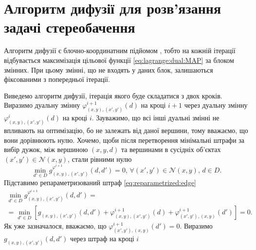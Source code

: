 \section{Алгоритм дифузії для розв'язання задачі стереобачення}

Алгоритм дифузії є блочно-координатним підйомом
\cite{overview:savchynskyy:diffusion},
тобто на кожній ітерації відбувається максимізація цільової функції
\eqref{eq:lagrange:dual:MAP} за блоком змінних.
При цьому змінні, що не входять у даних блок,
залишаються фіксованими з попередньої ітерації.

Виведемо алгоритм дифузії, ітерація якого буде складатися з двох кроків.
Виразимо дуальну змінну
$\varphi_{\left(x, y \right), \left(x', y' \right)}^{i + 1} \left( d \right)$
на кроці $i + 1$ через дуальну змінну
$\varphi_{\left(x, y \right), \left(x', y' \right)}^{i} \left( d \right)$
на кроці $i$.
Зауважимо, що всі інші дуальні змінні не впливають на оптимізацію,
бо не залежать від даної вершини, тому вважаємо, що вони дорівнюють нулю.
Хочемо, щоби після перетворення мінімальні штрафи за вибір дужок,
між вершиною $\left(x, y, d \right)$ та вершинами в сусідніх об'єктах
$\left(x', y' \right) \in \mathcal{N} \left(x, y \right)$, стали рівними нулю
\begin{equation} \label{eq:requirement:1}
    \min \limits_{d' \in D} g_{\left(x, y \right), \left(x', y' \right)}^{\varphi^{i + 1}}
    \left(
        d, d' \right
    ) = 0, \, \forall \left(x', y' \right) \in \mathcal{N} \left(x, y \right), \, d \in D.
\end{equation}
Підставимо репараметризований штраф \eqref{eq:reparametrized:edge}
\begin{equation*}
\begin{gathered}
    \min \limits_{d' \in D}
        g_{\left(x, y \right), \left(x', y' \right)}^{\varphi^{i + 1}}
    \left(
        d, d' \right
    ) = \\
    = \min \limits_{d' \in D} \left[
        g_{\left(x, y \right), \left(x', y' \right)} \left( d, d' \right) +
        \varphi_{\left(x, y \right), \left(x', y' \right)}^{i + 1} \left( d \right) +
        \varphi_{\left(x', y' \right), \left(x, y \right)}^{i + 1} \left( d' \right)
    \right] = 0.
\end{gathered}
\end{equation*}
Як уже зазначалося, вважаємо, що
$\varphi_{\left(x', y' \right), \left(x, y \right)}^{i + 1} \left( d' \right) =
    0$.
Виразимо $g_{\left(x, y \right), \left(x', y' \right)} \left( d, d' \right)$
через штраф на кроці $i$
